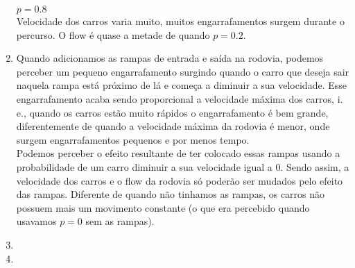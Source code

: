 \documentclass[11pt]{extarticle}
\begin{document}
\begin{enumerate}
  $p = 0.8$ \\
  Velocidade dos carros varia muito, muitos engarrafamentos surgem durante o percurso. O flow é quase a metade de quando $p = 0.2$.
\item                           %
  Quando adicionamos as rampas de entrada e saída na rodovia, podemos perceber um pequeno engarrafamento surgindo quando o carro que deseja sair naquela rampa está próximo de lá e começa a diminuir a sua velocidade. Esse engarrafamento acaba sendo proporcional a velocidade máxima dos carros, i. e., quando os carros estão muito rápidos o engarrafamento é bem grande, diferentemente de quando a velocidade máxima da rodovia é menor, onde surgem engarrafamentos pequenos e por menos tempo. \\
  Podemos perceber o efeito resultante de ter colocado essas rampas usando a probabilidade de um carro diminuir a sua velocidade igual a 0. Sendo assim, a velocidade dos carros e o flow da rodovia só poderão ser mudados pelo efeito das rampas. Diferente de quando não tinhamos as rampas, os carros não possuem mais um movimento constante (o que era percebido quando usavamos $p = 0$ sem as rampas). 
\item                           %
\item                           %
  
\end{enumerate}
\end{document}
